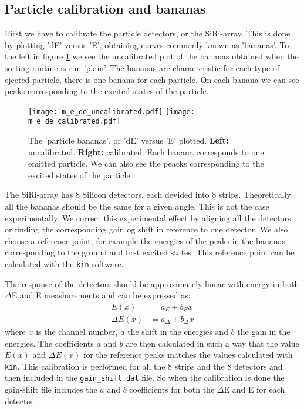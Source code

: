 \documentclass[11pt,a4wide]{article}
\begin{document}
\subsection{Particle calibration and bananas} \label{sec: particle_calib}
First we have to calibrate the particle detectors, or the SiRi-array. This is done by plotting 'dE' versus 'E', obtaining curves commonly known as 'bananas'. To the left in figure \ref{fig: de_e} we see the uncalibrated plot of the bananas obtained when the sorting routine is run 'plain'. The bananas are characteristic for each type of ejected particle, there is one banana for each particle. On each banana we can see peaks corresponding to the excited states of the particle. 

\begin{figure}[htp]
\centering
\texttt{[image: m\_e\_de\_uncalibrated.pdf]}
\texttt{[image: m\_e\_de\_calibrated.pdf]} 
\caption{The 'particle bananas', or 'dE' versus 'E' plotted. \textbf{Left:} uncalibrated. \textbf{Right:} calibrated. Each banana corresponds to one emitted particle. We can also see the peacks corresponding to the excited states of the particle.}
\label{fig: de_e}
\end{figure}

The SiRi-array has 8 Silicon detectors, each devided into 8 strips. Theoretically all the bananas should be the same for a given angle. This is not the case experimentally. We correct this experimental effect by aligning all the detectors, or finding the corresponding gain og shift in reference to one detector. We also choose a reference point, for example the energies of the peaks in the bananas corresponding to the ground and first excited states. This reference point can be calculated with the \texttt{kin} software. 

The response of the detectors should be approximately linear with energy in both $\Delta$E and E meashurements and can be expressed as:
\begin{align*}
E(x) &= a_E + b_Ex\\
\Delta E(x) &= a_\Delta + b_\Delta x
\end{align*}
where $x$ is the channel number, $a$ the shift in the energies and $b$ the gain in the energies. The coefficients $a$ and $b$ are then calculated in such a way that the value $E(x)$ and $\Delta E(x)$ for the reference peaks matches the values calculated with \texttt{kin}. This calibration is performed for all the 8 strips and the 8 detectors and then included in the \texttt{gain\_shift.dat} file. So when the calibration is done the gain-shift file includes the $a$ and $b$ coefficients for both the $\Delta$E and E for each detector.
\end{document}
